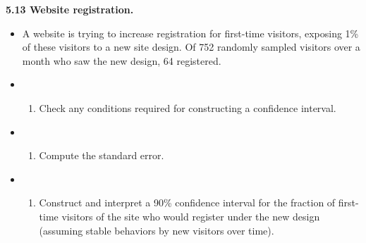 \documentclass[]{book}
\newenvironment{Shaded}{\begin{snugshade}}{\end{snugshade}}
\newcommand{\CommentTok}[1]{\textcolor[rgb]{0.56,0.35,0.01}{\textit{#1}}}
\providecommand{\tightlist}{%
  \setlength{\itemsep}{0pt}\setlength{\parskip}{0pt}}
\begin{document}
\begin{Shaded}
\end{Shaded}

\textbf{5.13 Website registration.}

\begin{itemize}
\item
  A website is trying to increase registration for first-time visitors, exposing 1\% of these visitors to a new site design. Of 752 randomly sampled visitors over a month who saw the new design, 64 registered.
\item
  \begin{enumerate}
  \def\labelenumi{(\alph{enumi})}
  \tightlist
  \item
    Check any conditions required for constructing a confidence interval.
  \end{enumerate}
\item
  \begin{enumerate}
  \def\labelenumi{(\alph{enumi})}
  \setcounter{enumi}{1}
  \tightlist
  \item
    Compute the standard error.
  \end{enumerate}
\item
  \begin{enumerate}
  \def\labelenumi{(\alph{enumi})}
  \setcounter{enumi}{2}
  \tightlist
  \item
    Construct and interpret a 90\% confidence interval for the fraction of first-time visitors of the site who would register under the new design (assuming stable behaviors by new visitors over time).
  \end{enumerate}
\end{itemize}
\end{document}
